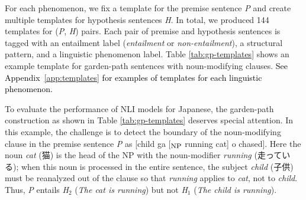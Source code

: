 \documentclass[11pt]{article}
\newcommand{\todo}[1]{\textcolor{black}{#1}}
\begin{document}
For each phenomenon, we fix a template for the premise sentence \textit{P}
and create multiple templates for hypothesis sentences \textit{H}.
In total, we produced 144 templates for (\textit{P}, \textit{H}) pairs.
Each pair of premise and hypothesis sentences is tagged with
an entailment label (\textit{entailment} or \textit{non-entailment}),
a structural pattern,
and a linguistic phenomenon label.
Table \ref{tab:gp-templates} shows an example template
for garden-path sentences with noun-modifying clauses.
\todo{See Appendix~\ref{app:templates} for examples of templates for each linguistic phenomenon.}

To evaluate the performance of NLI models for Japanese,
the garden-path construction as shown in Table \ref{tab:gp-templates}
deserves special attention.
In this example, the challenge is to detect
the boundary of the noun-modifying clause in the 
premise sentence \textit{P}
as [child ga [$_{\mbox{\footnotesize NP}}$ running cat] o chased].
Here the noun \textit{cat} (猫) is the head of the NP with the noun-modifier \textit{running} (走っている);
when this noun is processed in the entire sentence,
the subject \textit{child} (子供)
must be reanalyzed out of the clause so that \textit{running}
applies to \textit{cat}, not to \textit{child}.
Thus, \textit{P} entails \textit{H}$_2$ (\textit{The cat is running}) but not
\textit{H}$_1$ (\textit{The child is running}).
\end{document}

